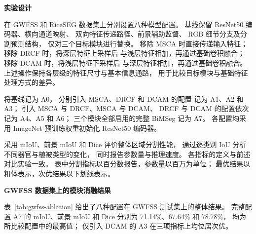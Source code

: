 \medskip\noindent\textbf{实验设计}\par
\label{sec:exp-ablation-design}

在 GWFSS 和 RiceSEG 数据集上分别设置八种模型配置。
基线保留 ResNet50 编码器、横向通道映射、
双向特征传递路径、前景辅助监督、
RGB 细节分支及分割预测结构，
仅对三个目标模块进行替换。
移除 MSCA 时直接传递输入特征；
移除 DRCF 时，将深层特征上采样后
与浅层特征相加，再通过基础卷积融合；
移除 DCAM 时，将浅层特征下采样后
与深层特征相加，再通过基础卷积融合。
上述操作保持各层级的特征尺寸与基本信息通路，
用于比较目标模块与基础特征处理方式的差异。

将基线记为 A0，
分别引入 MSCA、DRCF 和 DCAM 的配置
记为 A1、A2 和 A3；
引入 MSCA 与 DRCF、MSCA 与 DCAM、
DRCF 与 DCAM 的配置依次记为 A4、A5 和 A6；
三个模块全部启用的完整 BiMSeg 记为 A7。
各配置均采用 ImageNet 预训练权重初始化
ResNet50 编码器。

采用 mIoU、前景 mIoU 和 Dice
评价整体区域分割性能，
通过逐类别 IoU 分析不同器官与植被类型的变化，
同时报告参数量与推理速度。
各指标的定义与前述对比实验一致。
表中分割指标以百分数报告，参数量以百万为单位；
最优结果以粗体表示，次优结果以下划线表示。

\medskip\noindent\textbf{GWFSS 数据集上的模块消融结果}\par
\label{sec:exp-ablation-gwfss}

表~\ref{tab:gwfss-ablation}
给出了八种配置在 GWFSS 测试集上的整体结果。
完整配置 A7 的 mIoU、前景 mIoU 和 Dice
分别为 71.14\%、67.64\% 和 78.78\%，
均为所比较配置中的最高值；
仅引入 DCAM 的 A3 在三项指标上均位居次优。

